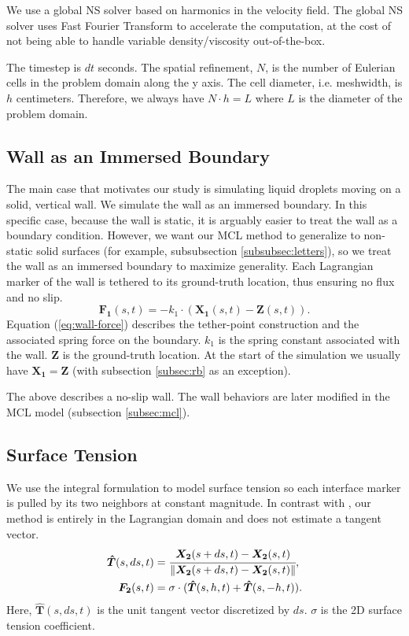 \documentclass{jfm}
\begin{document}
We use a global NS solver based on harmonics in the velocity field. The global NS solver uses Fast Fourier Transform to accelerate the computation, at the cost of not being able to handle variable density/viscosity out-of-the-box. 

The timestep is $dt$ seconds. The spatial refinement, $N$, is the number of Eulerian cells in the problem domain along the y axis. The cell diameter, i.e. meshwidth, is $h$ centimeters. Therefore, we always have $N \cdot h = L$ where $L$ is the diameter of the problem domain. 

\subsection{Wall as an Immersed Boundary} \label{subsec:wall}
The main case that motivates our study is simulating liquid droplets moving on a solid, vertical wall. We simulate the wall as an immersed boundary. In this specific case, because the wall is static, it is arguably easier to treat the wall as a boundary condition. However, we want our MCL method to generalize to non-static solid surfaces (for example, subsubsection \ref{subsubsec:letters}), so we treat the wall as an immersed boundary to maximize generality. Each Lagrangian marker of the wall is tethered to its ground-truth location, thus ensuring no flux and no slip. 
\begin{equation}
\bm{F_1}(s,t) = -k_1 \cdot (
    \bm{X_1}(s,t) - \bm{Z}(s,t)
). \label{eq:wall-force}
\end{equation}
Equation (\ref{eq:wall-force}) describes the tether-point construction and the associated spring force on the boundary. $k_1$ is the spring constant associated with the wall. $\boldsymbol{Z}$ is the ground-truth location. At the start of the simulation we usually have $\boldsymbol{X_1} = \boldsymbol{Z}$ (with subsection \ref{subsec:rb} as an exception). 

The above describes a no-slip wall. The wall behaviors are later modified in the MCL model (subsection \ref{subsec:mcl}). 

\subsection{Surface Tension}
We use the integral formulation to model surface tension \citep{surface_tension_review} so each interface marker is pulled by its two neighbors at constant magnitude. In contrast with \cite{surface_tension_still_tangent_applied_to_segment}, our method is entirely in the Lagrangian domain and does not estimate a tangent vector. 
\begin{align}
\bm{\hat{T}}(s,ds,t) & = \cfrac
    {       \bm{X_2}(s+ds,t) - \bm{X_2}(s,t)}
    {\lVert \bm{X_2}(s+ds,t) - \bm{X_2}(s,t) \rVert}, \\
\bm{F_2}(s,t) & = \sigma \cdot (
    \bm{\hat{T}}(s, h,t) + 
    \bm{\hat{T}}(s,-h,t)
). \label{eq:tension}
\end{align}
Here, $\boldsymbol{\hat{T}}(s,ds,t)$ is the unit tangent vector discretized by $ds$. $\sigma$ is the 2D surface tension coefficient. 
\end{document}
